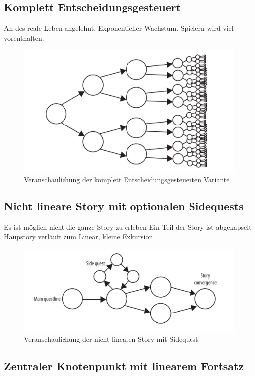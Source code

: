  
\subsection{Komplett Entscheidungsgesteuert} 

An des reale Leben angelehnt.
Exponentieller Wachstum. 
Spielern wird viel vorenthalten. 
 
\begin{figure}[H]
    \centering
    \includegraphics[width=.8\textwidth]{files/story/storyEntscheidungen}
    \caption{Veranschaulichung der komplett Entscheidungsgesteuerten Variante}
\end{figure} 
 

\subsection{Nicht lineare Story mit optionalen Sidequests} 

Es ist möglich nicht die ganze Story zu erleben
Ein Teil der Story ist abgekapselt
Haupstory verläuft zum Linear, kleine Exkursion

\begin{figure}[H]
    \centering
    \includegraphics[width=.8\textwidth]{files/story/storySidequest}
    \caption{Veranschaulichung der nicht linearen Story mit Sidequest}
\end{figure} 
 
\subsection{Zentraler Knotenpunkt mit linearem Fortsatz} 

